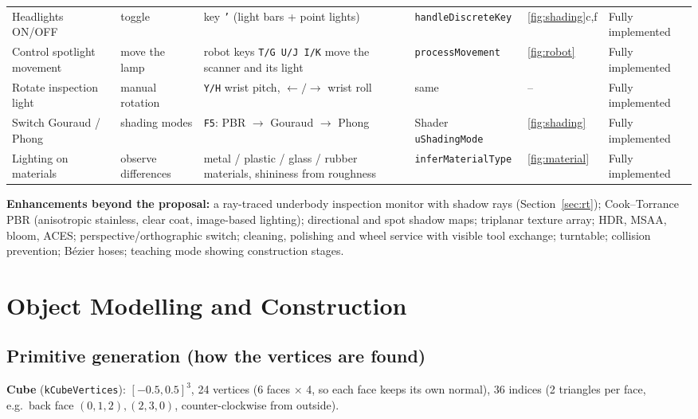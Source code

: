 \documentclass[10pt,a4paper]{article}
\newcommand{\fn}[1]{\texttt{#1}}
\begin{document}
{\begin{longtable}{@{}>{\raggedright}p{2.3cm}>{\raggedright}p{2.4cm}>{\raggedright}p{4.3cm}>{\raggedright}p{3.2cm}>{\raggedright}p{1.25cm}>{\raggedright\arraybackslash}p{2.3cm}@{}}
Headlights ON/OFF & toggle & key \fn{'} (light bars + point lights) & \fn{handleDiscreteKey} & \ref{fig:shading}c,f & Fully implemented\\
Control spotlight movement & move the lamp & robot keys \fn{T/G U/J I/K} move the scanner and its light & \fn{processMovement} & \ref{fig:robot} & Fully implemented\\
Rotate inspection light & manual rotation & \fn{Y/H} wrist pitch, $\leftarrow/\rightarrow$ wrist roll & same & -- & Fully implemented\\
Switch Gouraud / Phong & shading modes & \fn{F5}: PBR $\to$ Gouraud $\to$ Phong & Shader \fn{uShadingMode} & \ref{fig:shading} & Fully implemented\\
Lighting on materials & observe differences & metal / plastic / glass / rubber materials, shininess from roughness & \fn{inferMaterialType} & \ref{fig:material} & Fully implemented\\
\end{longtable}}


\textbf{Enhancements beyond the proposal:} a ray-traced underbody inspection monitor with shadow rays (Section~\ref{sec:rt}); Cook--Torrance PBR (anisotropic stainless, clear coat, image-based lighting);
directional and spot shadow maps; triplanar texture array; HDR, MSAA, bloom, ACES; perspective/orthographic switch;
cleaning, polishing and wheel service with visible tool exchange; turntable; collision prevention; B\'ezier hoses;
teaching mode showing construction stages.

\section{Object Modelling and Construction}\label{sec:objects}
\subsection{Primitive generation (how the vertices are found)}
\textbf{Cube} (\fn{kCubeVertices}): $[-0.5,0.5]^3$, 24 vertices (6 faces $\times$ 4, so each face keeps its own normal),
36 indices (2 triangles per face, e.g.\ back face $(0,1,2),(2,3,0)$, counter-clockwise from outside).
\end{document}

